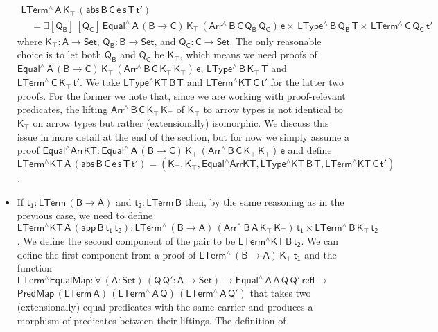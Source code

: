 \documentclass[9pt]{entcs}
\begin{document}
\begin{itemize}
  \[\begin{array}{l}
  \mathsf{LTerm^{\wedge}\,A\,K_\top\, (abs \,B \,C \,e \,s \,T
  \,t')}\\
\quad \mathsf{ = \exists [Q_B]\, [Q_C]\, Equal^{\wedge} \, A\, (B \to
    C)\, K_\top\, (Arr^{\wedge} \, B\, C\, Q_B \, Q_C)\, e \times \,
    LType^{\wedge}\, B\, Q_B\, T \times \, LTerm^{\wedge}\, C\, Q_C\,
    t' }
\end{array}\]
where $\mathsf{K_\top : A \to Set}$, $\mathsf{Q_B : B \to Set}$, and
$\mathsf{Q_C : C \to Set}$.  The only reasonable choice is to let both
$\mathsf{Q_B}$ and $\mathsf{Q_C}$ be $\mathsf{K_\top}$, which means we
need proofs of $\mathsf{Equal^{\wedge} \, A\, (B \to C)\, K_\top\,
  (Arr^{\wedge} \, B\, C\, K_\top \, K_\top)\, e}$,
$\mathsf{LType^{\wedge}\, B\, K_\top\, T}$ and
$\mathsf{LTerm^{\wedge}\, C\, K_\top\, t'}$.  We take
$\mathsf{LType^\wedge KT\, B\, T}$ and $\mathsf{LTerm^\wedge KT\, C\,
  t'}$ for the latter two proofs. For the former we note that, since
we are working with proof-relevant predicates, the lifting
$\mathsf{Arr^{\wedge} \, B\, C\, K_\top \, K_\top}$ of
$\mathsf{K_\top}$ to arrow types is not identical to $\mathsf{K_\top}$
on arrow types but rather (extensionally) isomorphic.  We discuss this
issue in more detail at the end of the section, but for now we simply
assume a proof $\mathsf{Equal^\wedge ArrKT : Equal^{\wedge} \, A\, (B
  \to C)\, K_\top\, (Arr^{\wedge} \, B\, C\, K_\top \, K_\top)\, e}$
and define $\mathsf{LTerm^\wedge KT\,A\, (abs\, B \,C \, e \,s \,T \,
  t') = (K_\top , K_\top , Equal^\wedge ArrKT , LType^\wedge KT\, B\,
  T , LTerm^\wedge KT\, C\, t') }$.
\item If $\mathsf{t_1 : LTerm\,(B \to A)}$ and $\mathsf{t_2 :
  LTerm\,B}$ then, by the same reasoning as in the previous case, we
  need to define $\mathsf{LTerm^\wedge KT\,A\, (app\, B \, t_1\,t_2)}
  : \mathsf{LTerm^{\wedge}\, (B \to A)\, (Arr^{\wedge} \, B\, A\,
    K_\top \, K_\top)\, t_1 \times LTerm^{\wedge}\, B\, K_\top\,
    t_2}$.  We define the second component of the pair to be
  $\mathsf{LTerm^\wedge KT\,B\,t_2}$. We can define the first
  component from a proof of $\mathsf{LTerm^{\wedge}\, (B \to A)\,
    K_\top\, t_1}$ and the function $\mathsf{LTerm^\wedge EqualMap :
    \forall\, (A : Set)\, (Q\,Q' : A \to Set) \to
    Equal^\wedge\,A\,A\,Q\,Q'\,refl \to}$
  $\mathsf{PredMap\,(LTerm\,A)\,
    (LTerm^{\wedge}\,A\,Q)\,(LTerm^{\wedge}\,A\,Q')}$ that takes two
  (extensionally) equal predicates with the same carrier and produces
  a morphism of predicates between their liftings. The definition of

\end{itemize}
\end{document}
